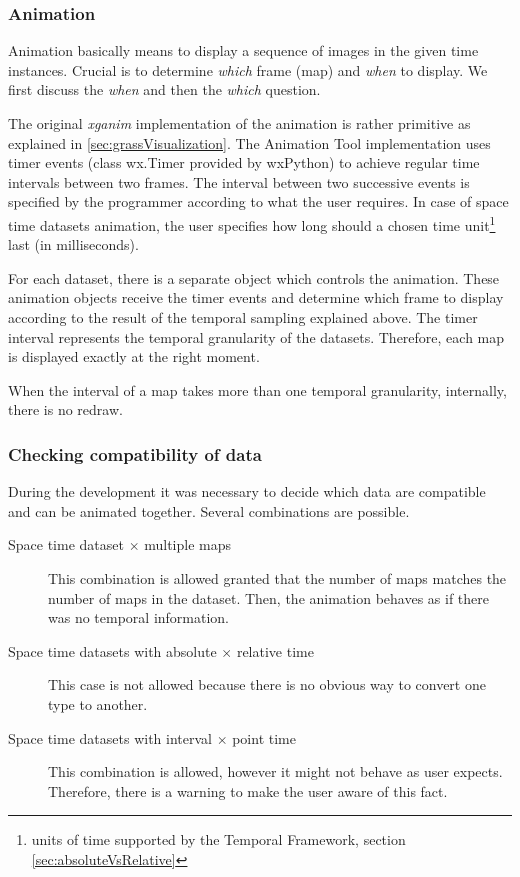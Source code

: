 \documentclass[a4paper,12pt,oneside]{book}
\newcommand{\module}[1]{\textsl{#1}}
\newcommand{\tf}{Temporal Framework\xspace}
\newcommand{\at}{Animation Tool\xspace}
\begin{document}
\begin{table}
\end{table}

\subsubsection{Animation}
Animation basically means to display a sequence of images in the given time instances.
Crucial is to determine \emph{which} frame (map) and \emph{when} to display.
We first discuss the \emph{when}  and then the \emph{which} question.


The original \module{xganim} implementation of the animation is rather primitive
as explained in \ref{sec:grassVisualization}.
The \at implementation uses timer events (class wx.Timer provided by wxPython) to achieve regular time intervals between two frames.
The interval between two successive events is specified by the programmer according to what the user requires.
In case of space time datasets animation, the user specifies how long
should a chosen time unit\footnote{units of time supported by the \tf, section \ref{sec:absoluteVsRelative}}
last (in milliseconds).

For each dataset, there is a separate object which controls the animation.
These animation objects receive the timer events and determine
which frame to display according to the result of the temporal sampling explained above.
The timer interval represents the temporal granularity of the datasets.
Therefore, each map is displayed exactly at the right moment.

When the interval of a map takes more than one temporal granularity, internally, there is no redraw.



\subsubsection{Checking compatibility of data}
During the development it was necessary to decide which data are compatible and can be animated together.
Several combinations are possible.
\begin{description}
  \item[Space time dataset $\times$ multiple maps]
  This combination is allowed granted that the number of maps matches the number of maps in the dataset.
  Then, the animation behaves as if there was no temporal information.

  \item[Space time datasets with absolute $\times$ relative time]
  This case is not allowed because there is no obvious way to convert one type to another.

  \item[Space time datasets with interval $\times$ point time]
  This combination is allowed, however it might not behave as user expects.
  Therefore, there is a warning to make the user aware of this fact.
 \end{description}
 
\end{document}
